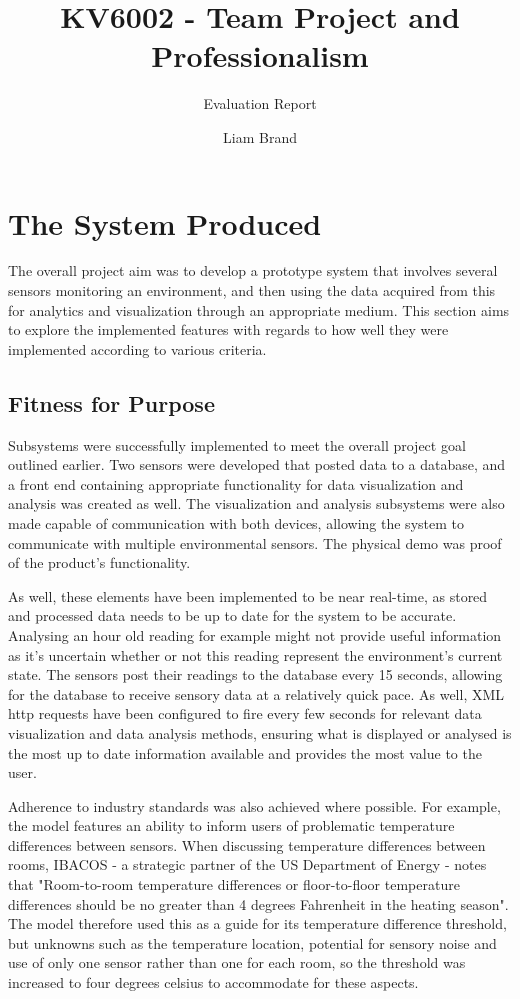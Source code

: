 \documentclass[]{report}
\title{KV6002 - Team Project and Professionalism}
\subtitle{Evaluation Report}
\author{Liam Brand}
\date{}
\begin{document}
\maketitle
\tableofcontents

\section{The System Produced}
The overall project aim was to develop a prototype system that involves several sensors monitoring an environment, and then using the data acquired from this for analytics and visualization through an appropriate medium. This section aims to explore the implemented features with regards to how well they were implemented according to various criteria.

	\subsection{Fitness for Purpose}
	Subsystems were successfully implemented to meet the overall project goal outlined earlier. Two sensors were developed that posted data to a database, and a front end containing appropriate functionality for data visualization and analysis was created as well. The visualization and analysis subsystems were also made capable of communication with both devices, allowing the system to communicate with multiple environmental sensors. The physical demo was proof of the product's functionality.
	\medskip
	
	As well, these elements have been implemented to be near real-time, as stored and processed data needs to be up to date for the system to be accurate. Analysing an hour old reading for example might not provide useful information as it's uncertain whether or not this reading represent the environment's current state. The sensors post their readings to the database every 15 seconds, allowing for the database to receive sensory data at a relatively quick pace. As well, XML http requests have been configured to fire every few seconds for relevant data visualization and data analysis methods, ensuring what is displayed or analysed is the most up to date information available and provides the most value to the user.
	\medskip
	
	Adherence to industry standards was also achieved where possible. For example, the model features an ability to inform users of problematic temperature differences between sensors. When discussing temperature differences between rooms, IBACOS - a strategic partner of the US Department of Energy - notes that "Room-to-room temperature differences or floor-to-floor temperature differences should be no greater than 4 degrees Fahrenheit in the heating season"\cite{burdick2011advanced}. The model therefore used this as a guide for its temperature difference threshold, but unknowns such as the temperature location, potential for sensory noise and use of only one sensor rather than one for each room, so the threshold was increased to four degrees celsius to accommodate for these aspects.
	
\end{document}
